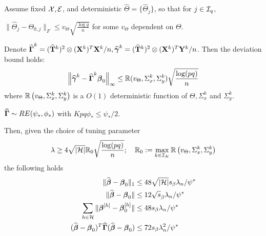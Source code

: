 \documentclass[12pt, letterpaper]{article}
\DeclareMathOperator*{\ve}{vec}
\numberwithin{equation}{section}
\begin{document}
\begin{Theorem}\label{thm:BetaThm}
Assume fixed ${\cal{X}}, {\cal{E}}$, and deterministic $\widehat \Theta = \{ \widehat \Theta_j \}$, so that for $j \in {\cal{I}}_q$,

 $\| \widehat \Theta_j - \Theta_{0,j} \|_F \leq v_\Theta \sqrt{\frac{\log q}{n}}$ for some $v_\Theta$ dependent on $\Theta$.

 Denote $\widehat {{\boldsymbol{\Gamma}}}^k = (\widehat {{\mathbf{T}}}^k)^2 \otimes ({\mathbf{X}}^k)^T {\mathbf{X}}^k/n, \widehat {{\boldsymbol{\gamma}}}^k = (\widehat {{\mathbf{T}}}^k)^2 \otimes ({\mathbf{X}}^k)^T {\mathbf{Y}}^k/n$. Then the deviation bound holds:
%
$$
\left\| \widehat {{\boldsymbol{\gamma}}}^k - \widehat {{\boldsymbol{\Gamma}}}^k {\boldsymbol{\beta}}_0 \right\|_\infty \leq {\mathbb{R}}( v_\Theta, \Sigma_x^k, \Sigma_y^k) \sqrt{ \frac{ \log(pq)}{n}}
$$
%
where ${\mathbb{R}} \left(v_\Theta, \Sigma_x^k, \Sigma_y^k \right)$ is a $O(1)$ deterministic function of $\Theta, \Sigma_x^k$ and $\Sigma_y^k$.

 $\widehat {{\boldsymbol{\Gamma}}} \sim RE(\psi_*, \phi_*)$ with $Kpq \phi_* \leq \psi_*/2$.

Then, given the choice of tuning parameter
%
$$
\lambda \geq 4 \sqrt{| {\cal{H}}|} {\mathbb{R}}_0 \sqrt{ \frac{ \log(pq)}{n}}; \quad 
{\mathbb{R}}_0 := \max_{k \in {\cal{I}}_K} {\mathbb{R}} \left(v_\Theta, \Sigma_x^k, \Sigma_y^k \right)
$$
%
the following holds
%
\begin{align}
\| \widehat {{\boldsymbol{\beta}}} - {\boldsymbol{\beta}}_0 \|_1 & \leq 48 \sqrt{ |{\cal{H}}|} s_\beta \lambda_n / \psi^* \label{eqn:BetaThmEqn1}\\
\| \widehat {{\boldsymbol{\beta}}} - {\boldsymbol{\beta}}_0 \| & \leq 12 \sqrt s_\beta \lambda_n / \psi^* \label{eqn:BetaThmEqn2}\\
\sum_{h \in {\cal{H}}} \| {\boldsymbol{\beta}}^{[h]} - {\boldsymbol{\beta}}_0^{[h]} \| & \leq 48 s_\beta \lambda_n / \psi^* \label{eqn:BetaThmEqn3}\\
(\widehat {{\boldsymbol{\beta}}} - {\boldsymbol{\beta}}_0 )^T \widehat {{\boldsymbol{\Gamma}}} (\widehat {{\boldsymbol{\beta}}} - {\boldsymbol{\beta}}_0 ) & \leq
72 s_\beta \lambda_n^2 / \psi^* \label{eqn:BetaThmEqn4}
\end{align}
%
\end{Theorem}
\end{document}
